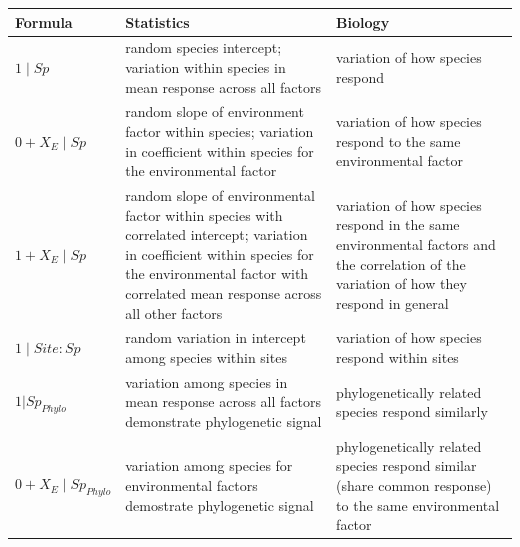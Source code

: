\begin{tabularx}{\textwidth}{|l|X|X|}
\hline
Formula & Statistics & Biology \\
\hline
$1 \mid Sp$ &
random species intercept; variation within species in mean response across all factors &
variation of how species respond \\
\hline

$0 + X_{E} \mid Sp$ &
random slope of environment factor within species; variation in coefficient within species for the environmental factor &
variation of how species respond to the same environmental factor \\
\hline

$1 + X_{E} \mid Sp$ &
random slope of environmental factor within species with correlated intercept; variation in coefficient within species for the environmental factor with correlated mean response across all other factors &
variation of how species respond in the same environmental factors and the correlation of the variation of how they respond in general \\
\hline

$1 \mid Site:Sp $ &
random variation in intercept among species within sites &
variation of how species respond within sites \\
\hline

$1 | Sp_{Phylo} $ &
variation among species in mean response across all factors demonstrate phylogenetic signal &
phylogenetically related species respond similarly \\
\hline

$0 + X_{E} \mid Sp_{Phylo}$ &
variation among species for environmental factors demostrate phylogenetic signal &
phylogenetically related species respond similar (share common response) to the same environmental factor \\
\hline
\end{tabularx}
            
                                                                        

